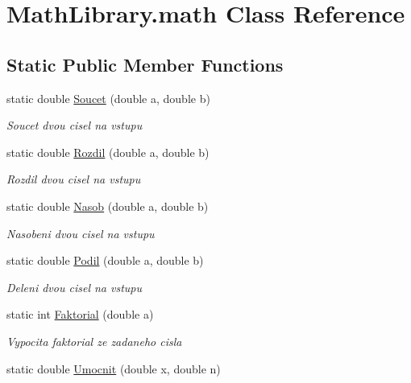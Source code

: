 \hypertarget{class_math_library_1_1math}{}\section{Math\+Library.\+math Class Reference}
\label{class_math_library_1_1math}
\subsection*{Static Public Member Functions}
\begin{DoxyCompactItemize}
\item 
static double \mbox{\hyperlink{class_math_library_1_1math_ad33392c83756895b4a5af417ed69270d}{Soucet}} (double a, double b)
\begin{DoxyCompactList}\small\item\em Soucet dvou cisel na vstupu \end{DoxyCompactList}\item 
static double \mbox{\hyperlink{class_math_library_1_1math_a888226aaba3ab5f4ef310bbcfb0f9cd7}{Rozdil}} (double a, double b)
\begin{DoxyCompactList}\small\item\em Rozdil dvou cisel na vstupu \end{DoxyCompactList}\item 
static double \mbox{\hyperlink{class_math_library_1_1math_a39f0ce528d77e03cf63a00333f5973e6}{Nasob}} (double a, double b)
\begin{DoxyCompactList}\small\item\em Nasobeni dvou cisel na vstupu \end{DoxyCompactList}\item 
static double \mbox{\hyperlink{class_math_library_1_1math_a4cd9b49df0b6f0073c95c95b3f0e6e2f}{Podil}} (double a, double b)
\begin{DoxyCompactList}\small\item\em Deleni dvou cisel na vstupu \end{DoxyCompactList}\item 
static int \mbox{\hyperlink{class_math_library_1_1math_af838c111bbe0f378bb2ccfb3591cce3a}{Faktorial}} (double a)
\begin{DoxyCompactList}\small\item\em Vypocita faktorial ze zadaneho cisla \end{DoxyCompactList}\item 
static double \mbox{\hyperlink{class_math_library_1_1math_a4e4be4de44305ffd1bd15db33fb26e3a}{Umocnit}} (double x, double n)

\end{DoxyCompactItemize}
